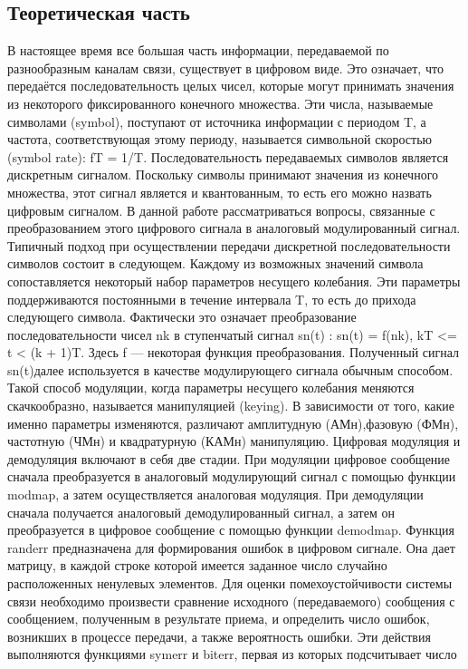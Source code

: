 \documentclass[10pt,a4paper]{article}
\begin{document}
\subsection{Теоретическая часть}
В настоящее время все большая часть информации, передаваемой по разнообразным каналам связи, существует в цифровом виде. Это означает, что передаётся последовательность целых чисел, которые могут принимать значения из некоторого фиксированного конечного 
множества. Эти числа, называемые символами (symbol), поступают от источника информации с периодом T, а частота, соответствующая этому периоду, называется символьной скоростью (symbol rate): fT = 1/T.  
Последовательность передаваемых символов является дискретным сигналом. Поскольку символы принимают значения из конечного множества, этот сигнал является и квантованным, то есть его можно назвать цифровым сигналом. В данной работе рассматриваться вопросы, связанные с преобразованием этого цифрового сигнала в аналоговый 
модулированный сигнал. 
Типичный подход при осуществлении передачи дискретной последовательности символов состоит в следующем. Каждому из возможных значений символа сопоставляется некоторый набор параметров несущего колебания. Эти параметры поддерживаются постоянными в течение 
интервала T, то есть до прихода следующего символа. Фактически это означает преобразование последовательности чисел {nk} в ступенчатый сигнал sn(t) : 
sn(t) = f(nk), kT <= t < (k + 1)T. 
Здесь f — некоторая функция преобразования. Полученный сигнал sn(t)далее используется в качестве модулирующего сигнала обычным способом. 
Такой способ модуляции, когда параметры несущего колебания меняются скачкообразно, называется манипуляцией (keying). В зависимости от того, какие именно параметры изменяются, различают амплитудную (АМн),фазовую (ФМн), частотную (ЧМн) и квадратурную (КАМн) 
манипуляцию. 
Цифровая модуляция и демодуляция включают в себя две стадии. При модуляции цифровое сообщение сначала преобразуется в аналоговый модулирующий сигнал с помощью функции modmap, а затем осуществляется аналоговая модуляция. При демодуляции сначала получается аналоговый демодулированный сигнал, а затем он преобразуется в цифровое сообщение с помощью функции demodmap.  
Функция randerr предназначена для формирования ошибок в цифровом сигнале. Она дает матрицу, в каждой строке которой имеется заданное число случайно расположенных ненулевых элементов. Для оценки помехоустойчивости системы связи необходимо произвести сравнение 
исходного (передаваемого) сообщения с сообщением, полученным в результате приема, и определить число ошибок, возникших в процессе передачи, а также вероятность ошибки. Эти действия выполняются функциями symerr и biterr, первая из которых подсчитывает число 
\end{document}
